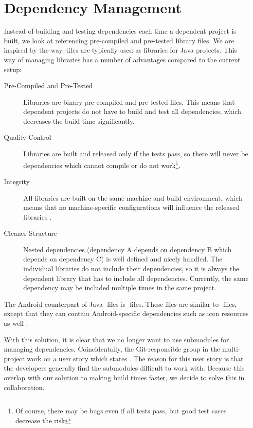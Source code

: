\section{Dependency Management}
Instead of building and testing dependencies each time a dependent project is built, we look at referencing pre-compiled and pre-tested library files. We are inspired by the way -files are typically used as libraries for Java projects. This way of managing libraries has a number of advantages compared to the current setup:
\begin{description}
  \item [Pre-Compiled and Pre-Tested] Libraries are binary pre-compiled and pre-tested files. This means that dependent projects do not have to build and test all dependencies, which decreases the build time significantly.
  \item[Quality Control] Libraries are built and released only if the tests pass, so there will never be dependencies which cannot compile or do not work\footnote{Of course, there may be bugs even if all tests pass, but good test cases decrease the risk}.
  \item[Integrity] All libraries are built on the same machine and build environment, which means that no machine-specific configurations will influence the released libraries \parencite{huttermann2014}.
  \item[Cleaner Structure] Nested dependencies (dependency A depends on dependency B which depends on dependency C) is well defined and nicely handled. The individual libraries do not include their dependencies, so it is always the dependent library that has to include all dependencies. Currently, the same dependency may be included multiple times in the same project.
\end{description}
The Android counterpart of Java -files is -files. These files are similar to -files, except that they can contain Android-specific dependencies such as icon resources as well \parencite{android-aar}.

With this solution, it is clear that we no longer want to use submodules for managing dependencies. Coincidentally, the Git-responsible group in the multi-project work on a user story which states . The reason for this user story is that the developers generally find the submodules difficult to work with. Because this overlap with our solution to making build times faster, we decide to solve this in collaboration.

